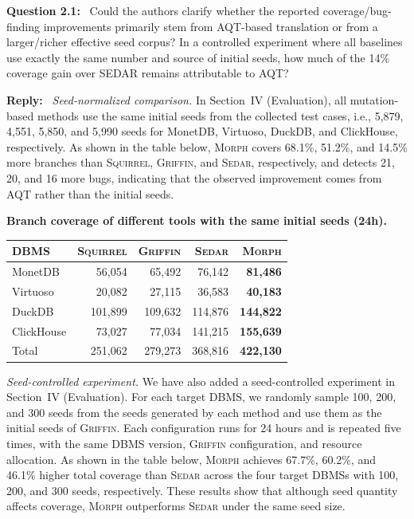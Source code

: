 \documentclass[12pt,letterpaper]{article}
\renewcommand{\arraystretch}{1.15}
\newcommand{\morph}{\textsc{Morph}}
\newcommand{\sedar}{\textsc{Sedar}}
\newcommand{\griffin}{\textsc{Griffin}}
\newcommand{\squirrel}{\textsc{Squirrel}}
\newcommand{\tool}{\morph}
\newcommand{\reviewstart}{\par\addvspace{0.85\baselineskip}\Needspace{4\baselineskip}\noindent}
\newcounter{commentanchor}
\newcommand{\reviewquestion}[1]{\reviewstart\renewcommand{\thecommentanchor}{#1}\refstepcounter{commentanchor}\label{question:#1}\textbf{Question #1:}\ }
\newcommand{\reply}{\par\nobreak\noindent\textbf{Reply:}\ }
\begin{document}
\reviewquestion{2.1} Could the authors clarify whether the reported coverage/bug-finding improvements primarily stem from AQT-based translation or from a larger/richer effective seed corpus? In a controlled experiment where all baselines use exactly the same number and source of initial seeds, how much of the 14\% coverage gain over SEDAR remains attributable to AQT?

\reply
\textit{Seed-normalized comparison.} In Section~IV (Evaluation), all mutation-based methods use the same initial seeds from the collected test cases, i.e., 5,879, 4,551, 5,850, and 5,990 seeds for MonetDB, Virtuoso, DuckDB, and ClickHouse, respectively. As shown in the table below, \tool{} covers 68.1\%, 51.2\%, and 14.5\% more branches than \squirrel{}, \griffin{}, and \sedar{}, respectively, and detects 21, 20, and 16 more bugs, indicating that the observed improvement comes from AQT rather than the initial seeds.

\begin{center}
\begin{minipage}{0.7\linewidth}
\centering\scriptsize\renewcommand{\arraystretch}{1.0}
\textbf{Branch coverage of different tools with the same initial seeds (24h).}
\par\smallskip
\begin{tabular}{lrrrr}
\toprule
DBMS & \squirrel{} & \griffin{} & \sedar{} & \tool{} \\
\midrule
MonetDB & 56,054 & 65,492 & 76,142 & \textbf{81,486} \\
Virtuoso & 20,082 & 27,115 & 36,583 & \textbf{40,183} \\
DuckDB & 101,899 & 109,632 & 114,876 & \textbf{144,822} \\
ClickHouse & 73,027 & 77,034 & 141,215 & \textbf{155,639} \\
\midrule
Total & 251,062 & 279,273 & 368,816 & \textbf{422,130} \\
\bottomrule
\end{tabular}
\end{minipage}
\end{center}

\textit{Seed-controlled experiment.} We have also added a seed-controlled experiment in Section~IV (Evaluation). For each target DBMS, we randomly sample 100, 200, and 300 seeds from the seeds generated by each method and use them as the initial seeds of \griffin{}. Each configuration runs for 24 hours and is repeated five times, with the same DBMS version, \griffin{} configuration, and resource allocation. As shown in the table below, \tool{} achieves 67.7\%, 60.2\%, and 46.1\% higher total coverage than \sedar{} across the four target DBMSs with 100, 200, and 300 seeds, respectively. These results show that although seed quantity affects coverage, \tool{} outperforms \sedar{} under the same seed size.
\end{document}
